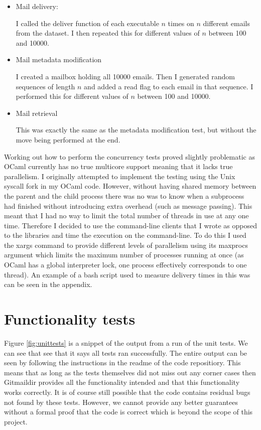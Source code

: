 \begin{itemize}
\item Mail delivery:

  I called the deliver function of each executable $n$ times on $n$ different emails from the dataset. I then repeated this for different values of $n$ between 100 and 10000.

\item Mail metadata modification

  I created a mailbox holding all 10000 emails. Then I generated random sequences of length $n$ and added a read flag to each email in that sequence. I performed this for different values of $n$ between 100 and 10000.

\item Mail retrieval

  This was exactly the same as the metadata modification test, but without the move being performed at the end.
\end{itemize}

Working out how to perform the concurrency tests proved slightly problematic as OCaml currently has no true multicore support meaning that it lacks true parallelism. I originally attempted to implement the testing using the Unix syscall fork in my OCaml code. However, without having shared memory between the parent and the child process there was no was to know when a subprocess had finished without introducing extra overhead (such as message passing). This meant that I had no way to limit the total number of threads in use at any one time. Therefore I decided to use the command-line clients that I wrote as opposed to the libraries and time the execution on the command-line. To do this I used the xargs command to provide different levels of parallelism using its maxprocs argument which limits the maximum number of processes running at once (as OCaml has a global interpreter lock, one process effectively corresponds to one thread). An example of a bash script used to measure delivery times in this was can be seen in the appendix.

\section{Functionality tests} \label{section:functionality_tests}

Figure \ref{fig:unittests} is a snippet of the output from a run of the unit tests. We can see that see that it says all tests ran successfully. The entire output can be seen by following the instructions in the readme of the code repositiory. This means that as long as the tests themselves did not miss out any corner cases then Gitmaildir provides all the functionality intended and that this functionality works correctly. It is of course still possible that the code contains residual bugs not found by these tests. However, we cannot provide any better guarantees without a formal proof that the code is correct which is beyond the scope of this project.

